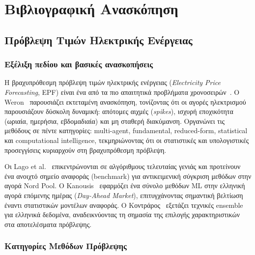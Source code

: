 \chapter{Βιβλιογραφική Ανασκόπηση}
\label{ch:literature}

\section{Πρόβλεψη Τιμών Ηλεκτρικής Ενέργειας}
\label{sec:epf_review}

\subsection{Εξέλιξη πεδίου και βασικές ανασκοπήσεις}

Η βραχυπρόθεσμη πρόβλεψη τιμών ηλεκτρικής ενέργειας
(\textit{Electricity Price Forecasting}, EPF) είναι ένα από τα πιο απαιτητικά προβλήματα χρονοσειρών~\cite{weron2014electricity}.
Ο Weron~\cite{weron2014electricity} παρουσιάζει εκτεταμένη ανασκόπηση,
τονίζοντας ότι οι αγορές ηλεκτρισμού παρουσιάζουν δύσκολη
δυναμική: απότομες αιχμές (\textit{spikes}), ισχυρή εποχικότητα
(ωριαία, ημερήσια, εβδομαδιαία) και μη σταθερή διακύμανση.
Οργανώνει τις μεθόδους σε πέντε κατηγορίες: multi-agent,
fundamental, reduced-form, statistical και computational intelligence,
τεκμηριώνοντας ότι οι στατιστικές και υπολογιστικές προσεγγίσεις
κυριαρχούν στη βραχυπρόθεσμη πρόβλεψη.

Οι Lago et al.~\cite{lago2021} επικεντρώνονται σε αλγόριθμους
τελευταίας γενιάς και προτείνουν ένα ανοιχτό σημείο αναφοράς (benchmark) για
αντικειμενική σύγκριση μεθόδων στην αγορά Nord Pool.
Ο Kanousis~\cite{kanousis2025} εφαρμόζει ένα σύνολο μεθόδων ML
στην ελληνική αγορά επόμενης ημέρας (\textit{Day-Ahead Market}),
επιτυγχάνοντας σημαντική βελτίωση έναντι στατιστικών μοντέλων αναφοράς.
Ο Κοντράρος~\cite{kontraros2023} εξετάζει τεχνικές ensemble
για ελληνικά δεδομένα, αναδεικνύοντας τη σημασία της επιλογής
χαρακτηριστικών στα αποτελέσματα πρόβλεψης.

\subsection{Κατηγορίες Μεθόδων Πρόβλεψης}

